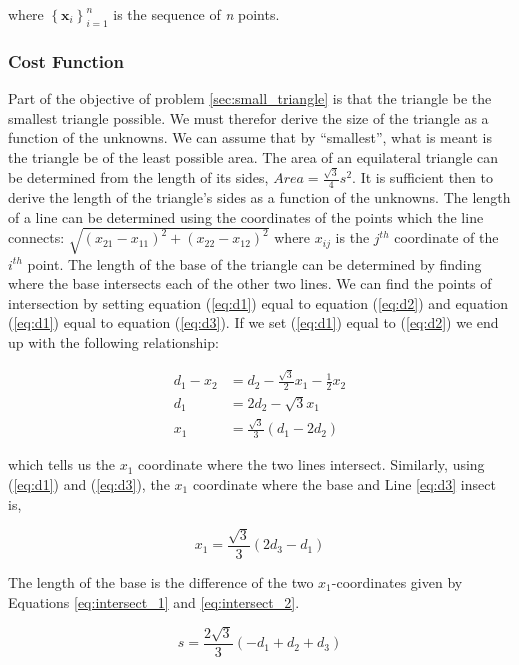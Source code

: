 \documentclass{article}
\begin{document}
\noindent where $\left\{ \mathbf{x}_i \right\}_{i=1}^n$ is the sequence of \textit{n} points.

\subsubsection{Cost Function}

Part of the objective of problem \ref{sec:small_triangle} is that the triangle be the smallest triangle possible.
We must therefor derive the size of the triangle as a function of the unknowns.
We can assume that by ``smallest'', what is meant is the triangle be of the least possible area.
The area of an equilateral triangle can be determined from the length of its sides, $Area = \frac{\sqrt{3}}{4} s^2$.
It is sufficient then to derive the length of the triangle's sides as a function of the unknowns.
The length of a line can be determined using the coordinates of the points which the line connects: $\sqrt{(x_{21} - x_{11})^2 + (x_{22} - x_{12})^2}$ where $x_{ij}$ is the $j^{th}$ coordinate of the $i^{th}$ point.
The length of the base of the triangle can be determined by finding where the base intersects each of the other two lines.
We can find the points of intersection by setting equation (\ref{eq:d1}) equal to equation (\ref{eq:d2}) and equation (\ref{eq:d1}) equal to equation (\ref{eq:d3}).
If we set (\ref{eq:d1}) equal to (\ref{eq:d2}) we end up with the following relationship:

\begin{align}
d_1 - x_2 &= d_2 - \frac{\sqrt{3}}{2} x_1 - \frac{1}{2} x_2\\
d_1 &= 2d_2 - \sqrt{3} x_1\\
\label{eq:intersect_1}
x_1 &= \frac{\sqrt{3}}{3}(d_1 - 2d_2) 
\end{align}

\noindent which tells us the $x_1$ coordinate where the two lines intersect.
Similarly, using (\ref{eq:d1}) and (\ref{eq:d3}), the $x_1$ coordinate where the base and Line \ref{eq:d3} insect is,

\begin{equation} \label{eq:intersect_2}
x_1 = \frac{\sqrt{3}}{3}(2d_3 - d_1) 
\end{equation}

\noindent The length of the base is the difference of the two $x_1$-coordinates given by Equations \ref{eq:intersect_1} and \ref{eq:intersect_2}.

\begin{equation} \label{eq:side}
s = \frac{2 \sqrt{3}}{3}(-d_1 + d_2 + d_3)
\end{equation}
\end{document}
